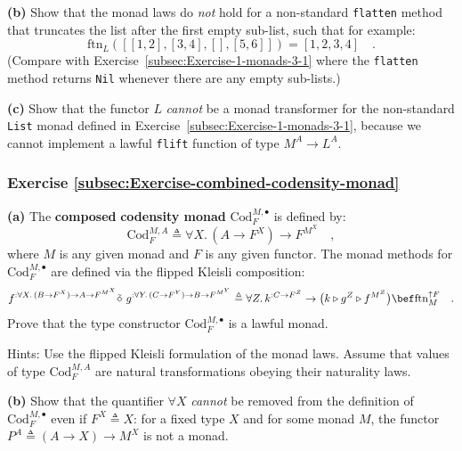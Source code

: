 \textbf{(b)} Show that the monad laws do \emph{not} hold for a non-standard
\lstinline!flatten! method that truncates the list after the first
empty sub-list, such that for example: 
\[
\text{ftn}_{L}(\left[\left[1,2\right],\left[3,4\right],\left[\right],\left[5,6\right]\right])=\left[1,2,3,4\right]\quad.
\]
(Compare
with Exercise~\ref{subsec:Exercise-1-monads-3-1} where the \lstinline!flatten!
method returns \lstinline!Nil! whenever there are any empty sub-lists.)

\textbf{(c)} Show that the functor $L$ \emph{cannot} be a monad transformer
for the non-standard \lstinline!List! monad defined in Exercise~\ref{subsec:Exercise-1-monads-3-1},
because we cannot implement a lawful \lstinline!flift! function of
type $M^{A}\rightarrow L^{A}$.

\subsubsection{Exercise \label{subsec:Exercise-combined-codensity-monad}\ref{subsec:Exercise-combined-codensity-monad}}

\textbf{(a)} The \textbf{composed}
\textbf{codensity monad} $\text{Cod}_{F}^{M,\bullet}$ is defined
by:
\[
\text{Cod}_{F}^{M,A}\triangleq\forall X.\,(A\rightarrow F^{X})\rightarrow F^{M^{X}}\quad,
\]
where $M$ is any given monad and $F$ is any given functor. The monad
methods for $\text{Cod}_{F}^{M,\bullet}$ are defined via the flipped
Kleisli composition:
\[
f^{:\forall X.\,(B\rightarrow F^{X})\rightarrow A\rightarrow F^{M^{X}}}\tilde{\diamond}\,\,g^{:\forall Y.\,(C\rightarrow F^{Y})\rightarrow B\rightarrow F^{M^{Y}}}\triangleq\forall Z.\,k^{:C\rightarrow F^{Z}}\rightarrow\big(k\triangleright g^{Z}\triangleright f^{M^{Z}}\big)\bef\text{ftn}_{M}^{\uparrow F}\quad.
\]
Prove that the type constructor $\text{Cod}_{F}^{M,\bullet}$ is a
lawful monad.

Hints: Use the flipped Kleisli formulation of the monad laws. Assume
that values of type $\text{Cod}_{F}^{M,A}$ are natural transformations
obeying their naturality laws.

\textbf{(b)} Show that the quantifier $\forall X$ \emph{cannot} be
removed from the definition of $\text{Cod}_{F}^{M,\bullet}$ even
if $F^{X}\triangleq X$: for a fixed type $X$ and for some monad
$M$, the functor $P^{A}\triangleq(A\rightarrow X)\rightarrow M^{X}$
is not a monad.

